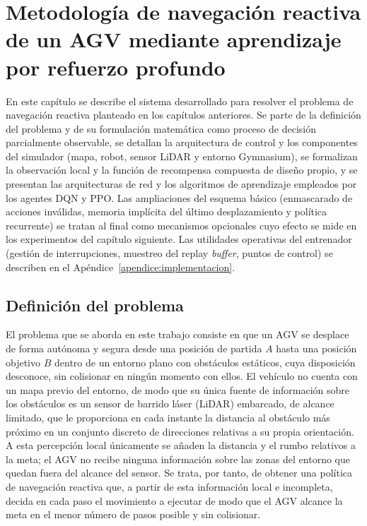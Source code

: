 \chapter{Metodología de navegación reactiva de un AGV mediante aprendizaje por refuerzo profundo}\label{cap:diseno-arquitectura}

En este capítulo se describe el sistema desarrollado para resolver el problema
de navegación reactiva planteado en los capítulos anteriores. Se parte de la
definición del problema y de su formulación matemática como proceso de
decisión parcialmente observable,
se detallan la arquitectura de control y los componentes del simulador
(mapa, robot, sensor LiDAR y entorno Gymnasium), se formalizan la observación
local y la función de recompensa compuesta de diseño propio, y se presentan las arquitecturas
de red y los algoritmos de aprendizaje empleados por los agentes DQN y PPO.
Las ampliaciones del esquema básico (enmascarado de acciones inválidas,
memoria implícita del último desplazamiento y política recurrente) se
tratan al final como mecanismos opcionales cuyo efecto se mide en los
experimentos del capítulo siguiente.
Las utilidades operativas del entrenador (gestión de interrupciones,
muestreo del replay \textit{buffer}, puntos de control) se describen en el
Apéndice~\ref{apendice:implementacion}.

\section{Definición del problema}\label{sec:definicion_problema}
El problema que se aborda en este trabajo consiste en que un AGV se desplace
de forma autónoma y segura desde una posición de partida $A$ hasta una
posición objetivo $B$ dentro de un entorno plano con obstáculos estáticos,
cuya disposición desconoce, sin colisionar en ningún momento con ellos. El
vehículo no cuenta con un mapa previo del entorno, de modo que su única
fuente de información sobre los obstáculos es un sensor de barrido láser
(LiDAR) embarcado, de alcance limitado, que le proporciona en cada instante
la distancia al obstáculo más próximo en un conjunto discreto de direcciones
relativas a su propia orientación. A esta percepción local únicamente se
añaden la distancia y el rumbo relativos a la meta; el AGV no recibe ninguna
información sobre las zonas del entorno que quedan fuera del alcance del
sensor. Se trata, por tanto, de obtener una política de navegación reactiva
que, a partir de esta información local e incompleta, decida en cada paso el
movimiento a ejecutar de modo que el AGV alcance la meta en el menor número
de pasos posible y sin colisionar.

